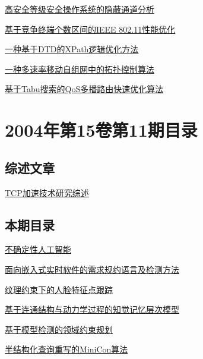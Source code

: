 \documentclass[a4paper]{article}
\begin{document}
\href{http://www.jos.org.cn/ch/reader/download_pdf.aspx?file_no=20041209&year_id=2004&quarter_id=12&falg=1}{高安全等级安全操作系统的隐蔽通道分析}

\href{http://www.jos.org.cn/ch/reader/download_pdf.aspx?file_no=20041210&year_id=2004&quarter_id=12&falg=1}{基于竞争终端个数区间的IEEE 802.11性能优化}

\href{http://www.jos.org.cn/ch/reader/download_pdf.aspx?file_no=20041211&year_id=2004&quarter_id=12&falg=1}{一种基于DTD的XPath逻辑优化方法}

\href{http://www.jos.org.cn/ch/reader/download_pdf.aspx?file_no=20041212&year_id=2004&quarter_id=12&falg=1}{一种多速率移动自组网中的拓扑控制算法}

\href{http://www.jos.org.cn/ch/reader/download_pdf.aspx?file_no=20041213&year_id=2004&quarter_id=12&falg=1}{基于Tabu搜索的QoS多播路由快速优化算法}


\section{\textbf{2004年第15卷第11期目录}}
\subsection{综述文章}
\href{http://www.jos.org.cn/ch/reader/download_pdf.aspx?file_no=20041111&year_id=2004&quarter_id=11&falg=1}{TCP加速技术研究综述}

\subsection{本期目录}
\href{http://www.jos.org.cn/ch/reader/download_pdf.aspx?file_no=20041101&year_id=2004&quarter_id=11&falg=1}{不确定性人工智能}

\href{http://www.jos.org.cn/ch/reader/download_pdf.aspx?file_no=20041102&year_id=2004&quarter_id=11&falg=1}{面向嵌入式实时软件的需求规约语言及检测方法}

\href{http://www.jos.org.cn/ch/reader/download_pdf.aspx?file_no=20041103&year_id=2004&quarter_id=11&falg=1}{纹理约束下的人脸特征点跟踪}

\href{http://www.jos.org.cn/ch/reader/download_pdf.aspx?file_no=20041104&year_id=2004&quarter_id=11&falg=1}{基于连通结构与动力学过程的知觉记忆层次模型}

\href{http://www.jos.org.cn/ch/reader/download_pdf.aspx?file_no=20041105&year_id=2004&quarter_id=11&falg=1}{基于模型检测的领域约束规划}

\href{http://www.jos.org.cn/ch/reader/download_pdf.aspx?file_no=20041106&year_id=2004&quarter_id=11&falg=1}{半结构化查询重写的MiniCon算法}
\end{document}
